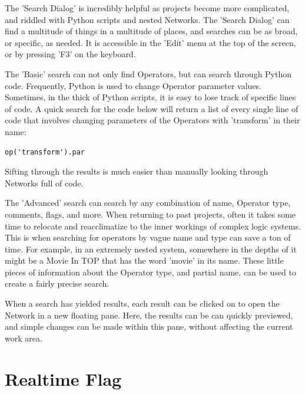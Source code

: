 \begin{fullwidth}

The 'Search Dialog' is incredibly helpful as projects become more complicated, and riddled with Python scripts and nested Networks. The 'Search Dialog' can find a multitude of things in a multitude of places, and searches can be as broad, or specific, as needed. It is accessible in the 'Edit' menu at the top of  the screen, or by pressing 'F3' on the keyboard.

The 'Basic' search can not only find Operators, but can search through Python code. Frequently, Python is used to change Operator parameter values. Sometimes, in the thick of Python scripts, it is easy to lose track of specific lines of code. A quick search for the code below will return a list of every single line of code that involves changing parameters of the Operators with 'transform' in their name:

\begin{lstlisting}
op('transform').par
\end{lstlisting}

Sifting through the results is much easier than manually looking through Networks full of code. 

The 'Advanced' search can search by any combination of name, Operator type, comments, flags, and more. When returning to past projects, often it takes some time to relocate and reacclimatize to the inner workings of complex logic systems. This is when searching for operators by vague name and type can save a ton of time. For example, in an extremely nested system, somewhere in the depths of it might be a Movie In TOP that has the word 'movie' in its name. These little pieces of information about the Operator type, and partial name, can be used to create a fairly precise search. 

When a search has yielded results, each result can be clicked on to open the Network in a new floating pane. Here, the results can be can quickly previewed, and simple changes can be made within this pane, without affecting the current work area.

\end{fullwidth}
\section{Realtime Flag}

